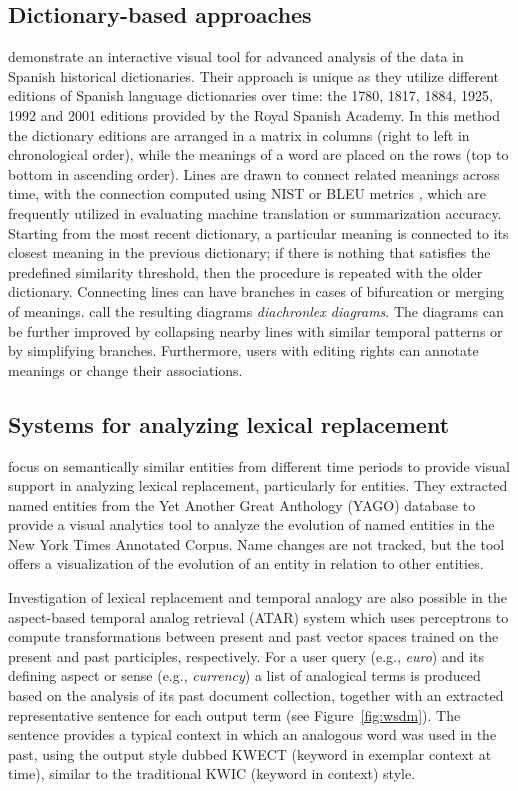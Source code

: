\documentclass[output=paper]{langsci/langscibook}
\begin{document}
\subsection{Dictionary-based approaches}
\citet{theron2015diachronic} demonstrate an interactive visual tool for advanced analysis of the data in Spanish historical dictionaries. Their approach is unique as they utilize different editions of Spanish language dictionaries over time: the 1780, 1817, 1884, 1925, 1992 and 2001 editions provided by the Royal Spanish Academy. 
In this method the dictionary editions are arranged in a matrix in columns (right to left in  chronological order), while the meanings of a word are placed on the rows (top to bottom in ascending order). Lines are drawn to connect  related meanings across time, with the connection computed using  NIST or BLEU metrics \citep{zhang2004interpreting}, which are frequently utilized in evaluating machine translation or summarization accuracy. Starting from the most recent dictionary, a particular meaning is connected to its closest meaning in the previous dictionary; if there is nothing that satisfies the predefined similarity threshold, then the procedure is repeated with the older dictionary. Connecting lines can have branches in cases of bifurcation or merging of meanings. \citet{theron2015diachronic} call the resulting diagrams \emph{diachronlex diagrams}. The diagrams can be further improved by collapsing nearby lines with similar temporal patterns or by simplifying branches. Furthermore, users with editing rights can annotate meanings or change their associations.


\subsection{Systems for analyzing lexical replacement}
\citet{mazeika2011entity} focus on semantically similar entities from different time periods to provide visual support in analyzing lexical replacement, particularly for entities. They extracted named entities from the Yet Another Great Anthology (YAGO) database to provide a visual analytics tool to analyze the evolution of named entities in the New York Times Annotated Corpus. Name changes are not tracked, but the tool offers a visualization of the evolution of an entity in  relation to other entities. 

Investigation of lexical replacement and temporal analogy are also  possible in the aspect-based temporal analog retrieval (ATAR) system \citep{zhangwsdm} which uses perceptrons to compute transformations between present and past vector spaces trained on the present and past participles, respectively. For a user query (e.g., \emph{euro}) and its defining aspect or sense (e.g., \emph{currency}) a list of analogical terms is produced based on the analysis of its past document collection, together with an extracted representative sentence for each output term (see Figure~\ref{fig:wsdm}). The sentence provides a typical context in which an analogous word was used in the past, using the output style dubbed KWECT (keyword in exemplar context at time), similar to the traditional KWIC (keyword in context) style. 
\end{document}
